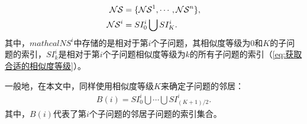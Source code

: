 \vspace{-1em}
\begin{align}
    \label{eq:邻域结构集合}
    \mathcal{NS} & = \{\mathcal{NS}^1, \cdots, \mathcal{NS}^n\}, \\
    \mathcal{NS}^i &= SI^i_0 \bigcup SI^i_K. \notag
\end{align}
其中，$mathcal{NS}^i$中存储的是相对于第$i$个子问题，其相似度等级为0和$K$的子问题的索引，$SI^i_k$是相对于第$i$个子问题相似度等级为$k$的所有子问题的索引（\autoref{eq:获取合适的相似度等级}）。
\par
一般地，在本文中，同样使用相似度等级$K$来确定子问题的邻居：
\begin{align}
    \label{eq:邻居子问题}
    B(i) = SI^i_0 \bigcup \cdots \bigcup SI^i_{(K+1)/2}.
\end{align}
其中，$B(i)$代表了第$i$个子问题的邻居子问题的索引集合。

